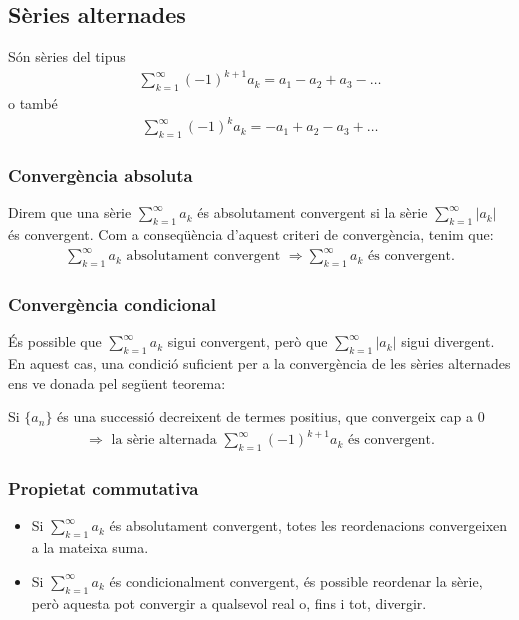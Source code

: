 \subsection{Sèries alternades}
Són sèries del tipus
\begin{align}
    \sum\limits_{k=1}^{\infty} (-1)^{k+1} a_{k} = a_{1} - a_{2} + a_{3} - \dots 
\end{align}
o també
\begin{align}
    \sum\limits_{k=1}^{\infty} (-1)^{k} a_{k} = - a_{1} + a_{2} - a_{3} + \dots 
\end{align}

\subsubsection*{Convergència absoluta}
Direm que una sèrie $\sum_{k=1}^{\infty} a_{k}$ és absolutament convergent si la sèrie $\sum_{k=1}^{\infty} |a_{k}|$ és convergent. Com a conseqüència d'aquest criteri de convergència, tenim que:
\begin{align}
    \sum_{k=1}^{\infty} a_{k} \text{ absolutament convergent } \Rightarrow \sum_{k=1}^{\infty} a_{k} \text{ és convergent}.
\end{align}

\subsubsection*{Convergència condicional}
És possible que $\sum_{k=1}^{\infty} a_{k}$ sigui convergent, però que $\sum_{k=1}^{\infty} |a_{k}|$ sigui divergent. En aquest cas, una condició suficient per a la convergència de les sèries alternades ens ve donada pel següent teorema:

Si $\{a_{n}\}$ és una successió decreixent de termes positius, que convergeix cap a 0
\begin{align}
    \Rightarrow \text{ la sèrie alternada } \sum_{k=1}^{\infty} (-1)^{k+1} a_{k} \text{ és convergent}.
\end{align}

\subsubsection*{Propietat commutativa}
\begin{itemize}
    \item Si $\sum_{k=1}^{\infty} a_{k}$ és absolutament convergent, totes les reordenacions convergeixen a la mateixa suma.
    \item Si $\sum_{k=1}^{\infty} a_{k}$ és condicionalment convergent, és possible reordenar la sèrie, però aquesta pot convergir a qualsevol real o, fins i tot, divergir.
\end{itemize}